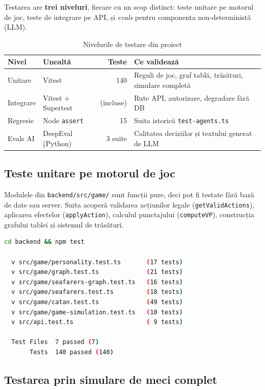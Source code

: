 \documentclass[11pt,a4paper]{article}
\begin{document}
Testarea are \textbf{trei niveluri}, fiecare cu un scop distinct: teste
unitare pe motorul de joc, teste de integrare pe API, și \textit{evals}
pentru componenta non-deterministă (LLM).

\begin{table}[H]
\centering
\begin{tabularx}{\textwidth}{@{}l l r X@{}}
\toprule
\textbf{Nivel} & \textbf{Unealtă} & \textbf{Teste} & \textbf{Ce validează} \\
\midrule
Unitare & Vitest & 140 & Reguli de joc, graf tablă, trăsături, simulare completă \\
Integrare & Vitest + Supertest & (incluse) & Rute API, autorizare, degradare fără DB \\
Regresie & Node \texttt{assert} & 15 & Suita istorică \texttt{test-agents.ts} \\
Evals AI & DeepEval (Python) & 3 suite & Calitatea deciziilor și textului generat de LLM \\
\bottomrule
\end{tabularx}
\caption{Nivelurile de testare din proiect}
\end{table}

\subsection{Teste unitare pe motorul de joc}

Modulele din \texttt{backend/src/game/} sunt funcții pure, deci pot fi testate
fără bază de date sau server. Suita acoperă validarea acțiunilor legale
(\texttt{getValidActions}), aplicarea efectelor (\texttt{applyAction}),
calculul punctajului (\texttt{computeVP}), construcția grafului tablei
și sistemul de trăsături.

\begin{lstlisting}[language=bash,caption={Rularea suitei complete de teste}]
cd backend && npm test

  v src/game/personality.test.ts       (17 tests)
  v src/game/graph.test.ts             (21 tests)
  v src/game/seafarers-graph.test.ts   (16 tests)
  v src/game/seafarers.test.ts         (18 tests)
  v src/game/catan.test.ts             (49 tests)
  v src/game/game-simulation.test.ts   (10 tests)
  v src/api.test.ts                    ( 9 tests)

  Test Files  7 passed (7)
       Tests  140 passed (140)
\end{lstlisting}

\subsection{Testarea prin simulare de meci complet}
\end{document}
